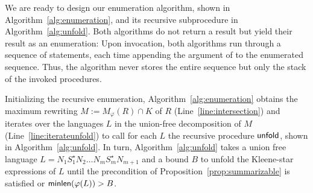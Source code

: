 \documentclass[envcountsame]{llncs}
\newcommand{\unfold}{\ensuremath{{\sf unfold}}\xspace}
\newcommand{\minlength}{\ensuremath{{\sf minlen}}\xspace}
\begin{document}
We are ready to design our enumeration algorithm, shown in
Algorithm~\ref{alg:enumeration}, and its recursive subprocedure in
Algorithm~\ref{alg:unfold}.
Both algorithms do not return a result but yield their result as an
enumeration: Upon invocation, both algorithms run through a sequence
of \Yield statements, each time appending the argument of \Yield to
the enumerated sequence.
Thus, the algorithm never stores the entire sequence but only the
stack of the invoked procedures.



Initializing the recursive enumeration,
Algorithm~\ref{alg:enumeration} obtains the maximum rewriting $M :=
M_\varphi(R) \cap K$ of $R$ (Line~\ref{line:intersection}) and
iterates over the languages $L$ in the union-free decomposition of $M$
(Line~\ref{line:iterateunfold}) to call for each $L$ the recursive
procedure $\unfold$, shown in Algorithm~\ref{alg:unfold}.
In turn, Algorithm~\ref{alg:unfold} takes a union free language
$L=N_1S_1^\star N_2\dots N_mS_m^\star N_{m+1}$ and a bound $B$ to
unfold the Kleene-star expressions of $L$ until the precondition of
Proposition~\ref{prop:summarizable} is satisfied or
$\minlength(\varphi(L))>B$.
\end{document}
